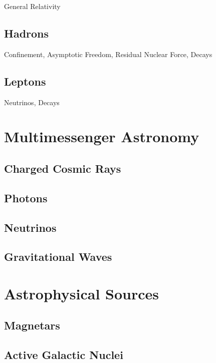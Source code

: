 General Relativity

\subsection*{Hadrons}
\label{sub:hadrons}

Confinement, Asymptotic Freedom, Residual Nuclear Force, Decays

\subsection*{Leptons}
\label{sub:leptons}

Neutrinos, Decays

\section{Multimessenger Astronomy}
\label{sec:multimessenger}

\subsection*{Charged Cosmic Rays}
\label{sub:rays}

\subsection*{Photons}
\label{sub:photons}

\subsection*{Neutrinos}
\label{sub:neutrinos}

\subsection*{Gravitational Waves}
\label{sub:gravitational}

\section{Astrophysical Sources}
\label{sec:sources}

\subsection*{Magnetars}
\label{sub:magnetars}

\subsection*{Active Galactic Nuclei}
\label{sub:agn}

